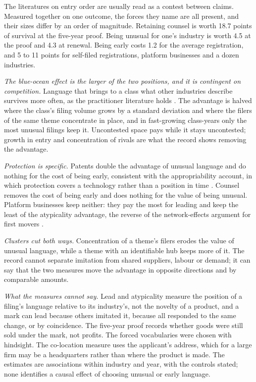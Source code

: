 The literatures on entry order are usually read as a contest between
claims. Measured together on one outcome, the forces they name are all
present, and their sizes differ by an order of magnitude. Retaining
counsel is worth 18.7 points of survival at the five-year proof. Being
unusual for one's industry is worth 4.5 at the proof and 4.3 at
renewal. Being early costs 1.2 for the average registration, and 5 to 11
points for self-filed registrations, platform businesses and a dozen
industries.

\emph{The blue-ocean effect is the larger of the two positions, and it is
contingent on competition.} Language that brings to a class what other
industries describe survives more often, as the practitioner literature
holds \citep{KimMauborgne2004}. The advantage is halved where the
class's filing volume grows by a standard deviation and where the filers
of the same theme concentrate in place, and in fast-growing class-years
only the most unusual filings keep it. Uncontested space pays while it
stays uncontested; growth in entry and concentration of rivals are what
the record shows removing the advantage.

\emph{Protection is specific.} Patents double the advantage of unusual
language and do nothing for the cost of being early, consistent with the
appropriability account, in which protection covers a technology rather
than a position in time \citep{Teece1986}. Counsel
removes the cost of being early and does nothing for the value of being
unusual. Platform businesses keep neither: they pay the most for leading
and keep the least of the atypicality advantage, the reverse of the
network-effects argument for first movers \citep{LiebermanMontgomery1988}.

\emph{Clusters cut both ways.} Concentration of a theme's filers erodes
the value of unusual language, while a theme with an identifiable hub
keeps more of it. The record cannot separate imitation from shared
suppliers, labour or demand; it can say that the two measures move the
advantage in opposite directions and by comparable amounts.

\emph{What the measures cannot say.} Lead and atypicality measure the
position of a filing's language relative to its industry's, not the
novelty of a product, and a mark can lead because others imitated it,
because all responded to the same change, or by coincidence. The
five-year proof records whether goods were still sold under the mark,
not profits. The forced vocabularies were chosen with hindsight. The
co-location measure uses the applicant's address, which for a large firm
may be a headquarters rather than where the product is made. The
estimates are associations within industry and year, with the controls
stated; none identifies a causal effect of choosing unusual or early
language.

